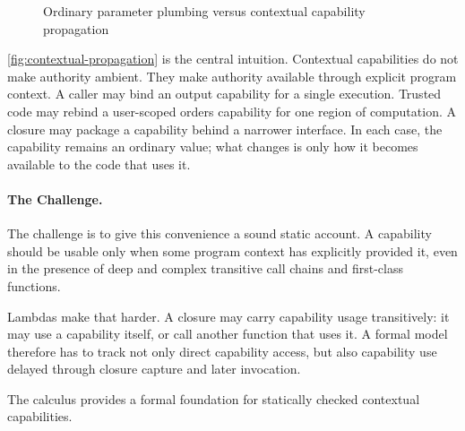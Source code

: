 \begin{figure}[t]
\centering
{}
\caption{Ordinary parameter plumbing versus contextual capability propagation}
\label{fig:contextual-propagation}
\end{figure}

\autoref{fig:contextual-propagation} is the central intuition. %
Contextual capabilities do not make authority ambient. %
They make authority available through explicit program context. %
A caller may bind an output capability for a single execution. %
Trusted code may rebind a user-scoped orders capability for one region of
computation. %
A closure may package a capability behind a narrower interface. %
In each case, the capability remains an ordinary value; what changes is only how
it becomes available to the code that uses it. %

\paragraph{The Challenge.}
The challenge is to give this convenience a sound static account. %
A capability should be usable only when some program context has explicitly
provided it, even in the presence of deep and complex transitive call chains and
first-class functions. %

Lambdas make that harder. %
A closure may carry capability usage transitively: it may use a capability
itself, or call another function that uses it. %
A formal model therefore has to track not only direct capability access, but
also capability use delayed through closure capture and later invocation. %

The calculus \lambdaCC{} provides a formal foundation for statically checked
contextual capabilities. %
